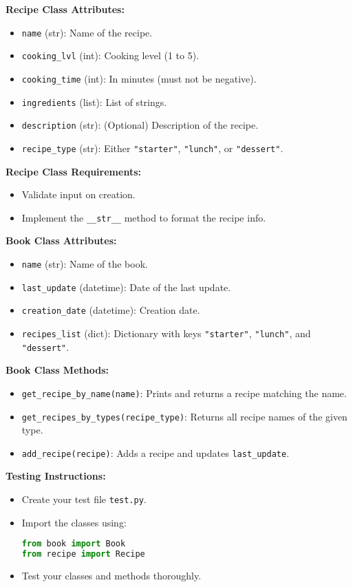 \documentclass[12pt,a4paper]{article}
\begin{document}
\textbf{Recipe Class Attributes:}
\begin{itemize}
  \item \texttt{name} (str): Name of the recipe.
  \item \texttt{cooking\_lvl} (int): Cooking level (1 to 5).
  \item \texttt{cooking\_time} (int): In minutes (must not be negative).
  \item \texttt{ingredients} (list): List of strings.
  \item \texttt{description} (str): (Optional) Description of the recipe.
  \item \texttt{recipe\_type} (str): Either \texttt{"starter"}, \texttt{"lunch"}, or \texttt{"dessert"}.
\end{itemize}

\textbf{Recipe Class Requirements:}
\begin{itemize}
  \item Validate input on creation.
  \item Implement the \texttt{\_\_str\_\_} method to format the recipe info.
\end{itemize}

\textbf{Book Class Attributes:}
\begin{itemize}
  \item \texttt{name} (str): Name of the book.
  \item \texttt{last\_update} (datetime): Date of the last update.
  \item \texttt{creation\_date} (datetime): Creation date.
  \item \texttt{recipes\_list} (dict): Dictionary with keys \texttt{"starter"}, \texttt{"lunch"}, and \texttt{"dessert"}.
\end{itemize}

\textbf{Book Class Methods:}
\begin{itemize}
  \item \texttt{get\_recipe\_by\_name(name)}: Prints and returns a recipe matching the name.
  \item \texttt{get\_recipes\_by\_types(recipe\_type)}: Returns all recipe names of the given type.
  \item \texttt{add\_recipe(recipe)}: Adds a recipe and updates \texttt{last\_update}.
\end{itemize}

\textbf{Testing Instructions:}
\begin{itemize}
  \item Create your test file \texttt{test.py}.
  \item Import the classes using:
  \begin{lstlisting}[language=Python]
from book import Book
from recipe import Recipe
  \end{lstlisting}
  \item Test your classes and methods thoroughly.
\end{itemize}
\end{document}
